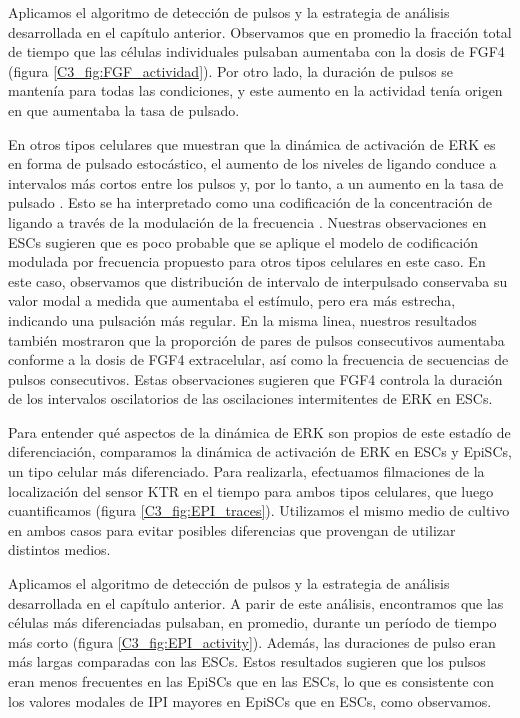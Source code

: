\documentclass[./main.tex]{subfiles}
\begin{document}
Aplicamos el algoritmo de detección de pulsos y la estrategia de análisis desarrollada en el capítulo anterior. Observamos que en promedio la fracción total de tiempo que las células individuales pulsaban aumentaba con la dosis de FGF4 (figura \ref{C3_fig:FGF_actividad}). Por otro lado, la duración de pulsos se mantenía para todas las condiciones, y este aumento en la actividad tenía origen en que aumentaba la tasa de pulsado. 


En otros tipos celulares que muestran que la dinámica de activación de ERK es en forma de pulsado estocástico, el aumento de los niveles de ligando conduce a intervalos más cortos entre los pulsos y, por lo tanto, a un aumento en la tasa de pulsado \cite{Albeck2013}. Esto se ha interpretado como una codificación de la concentración de ligando a través de la modulación de la frecuencia \cite{Li2019}. Nuestras observaciones en ESCs sugieren que es poco probable que se aplique el modelo de codificación modulada por frecuencia propuesto para otros tipos celulares en este caso. En este caso, observamos que distribución de intervalo de interpulsado conservaba su valor modal a medida que aumentaba el estímulo, pero era más estrecha, indicando una pulsación más regular. En la misma linea, nuestros resultados también mostraron que la proporción de pares de pulsos consecutivos aumentaba conforme a la dosis de FGF4 extracelular, así como la frecuencia de secuencias de pulsos consecutivos. Estas observaciones sugieren que FGF4 controla la duración de los intervalos oscilatorios de las oscilaciones intermitentes de ERK en ESCs. 


Para entender qué aspectos de la dinámica de ERK son propios de este estadío de diferenciación, comparamos la dinámica de activación de ERK en ESCs y EpiSCs, un tipo celular más diferenciado. Para realizarla, efectuamos filmaciones de la localización del sensor KTR en el tiempo para ambos tipos celulares, que luego cuantificamos (figura \ref{C3_fig:EPI_traces}). Utilizamos el mismo medio de cultivo en ambos casos para evitar posibles diferencias que provengan de utilizar distintos medios.

Aplicamos el algoritmo de detección de pulsos y la estrategia de análisis desarrollada en el capítulo anterior. A parir de este análisis, encontramos que las células más diferenciadas pulsaban, en promedio, durante un período de tiempo más corto (figura \ref{C3_fig:EPI_activity}). Además, las duraciones de pulso eran más largas comparadas con las ESCs. Estos resultados sugieren que los pulsos eran menos frecuentes en las EpiSCs que en las ESCs, lo que es consistente con los valores modales de IPI mayores en EpiSCs que en ESCs, como observamos. 
\end{document}
